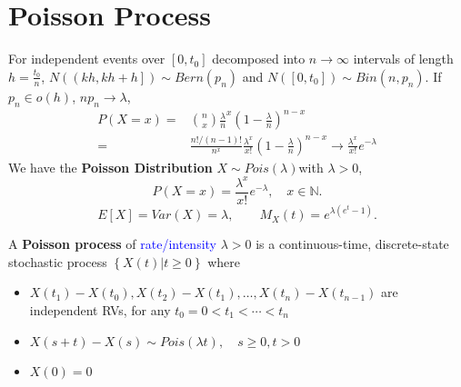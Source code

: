 \section{Poisson Process}
For independent events over $\left[ 0,t_0 \right] $ decomposed into $n\to
\infty$ intervals of length $h=\frac{t_0}{n}$, $N\left(\left( \left.  kh, kh+h
\right] \right.\right) \sim Bern(p_{n})$ and $N\left(\left[ 0,t_0
\right]\right) \sim Bin(n,p_{n})$. If $p_{n}\in o\left(h\right)$, $np_{n}\to
\lambda$,
\begin{align*}
  P(X=x)=&\binom{n}{x}\frac{\lambda}{n}^{x}{(1-\frac{\lambda}{n})}^{n-x}\\
  =&\frac{n\mathpunct{!}/(n-1)\mathpunct{!}}{n^{x}} \frac{\lambda^{x}}{x\mathpunct{!}} {\left( 1-\frac{\lambda}{n} \right)} ^{n-x}
  \to \frac{\lambda^{x}}{x\mathpunct{!}} e^{-\lambda}
\end{align*}
We have the \textbf{\textcolor{Bittersweet}{Poisson Distribution}} $X\sim
Pois\left( \lambda \right) $with $\lambda>0$,
\[ P\left( X=x \right) =\frac{\lambda^{x}}{x\mathpunct{!}}e^{-\lambda}, \quad x\in \mathbb{N}.\] 
\[E\left[ X \right] =Var\left( X \right) =\lambda,\qquad M_X\left( t \right) =e^{\lambda\left( e^{t}-1 \right) }.\] 

A \textbf{\textcolor{Bittersweet}{Poisson process}} of
\textcolor{Blue}{rate/intensity} $\lambda>0$ is a continuous-time,
discrete-state stochastic process $\left\{ X(t)|t\ge 0 \right\} $ where
\begin{itemize}
  \item $X(t_1)-X(t_0),X(t_2)-X(t_1),\ldots,X(t_{n})-X(t_{n-1})$
    are independent RVs, for any $t_0=0<t_1<\cdots<t_{n}$
  \item $X(s+t)-X(s)\sim Pois\left( \lambda t \right), \quad s\ge 0, t>0$
  \item $X(0)=0$
\end{itemize}

